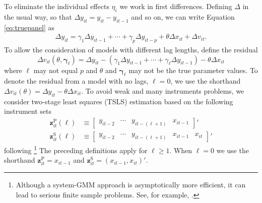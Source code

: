 To eliminate the individual effects $\eta_i$ we work in first differences.
Defining $\Delta$ in the usual way, so that $\Delta y_{it} = y_{it} - y_{it-1}$ and so on, we can write Equation \ref{eq:truepanel} as
\begin{align}
  \Delta y_{it} = \gamma_1 \Delta y_{it-1} + \cdots + \gamma_p \Delta y_{it-p} + \theta \Delta x_{it} + \Delta v_{it}.
  \label{eq:truepaneldiff}
\end{align}
To allow the consideration of models with different lag lengths, define the residual
\begin{equation}
  \Delta v_{it}\left(\theta, \boldsymbol{\gamma}_\ell \right) = \Delta y_{it} - \left(\gamma_1 \Delta y_{it-1} + \cdots + \gamma_\ell \Delta y_{it-1} \right) - \theta \Delta x_{it} 
  \label{eq:panelresidual}
\end{equation}
where $\ell$ may not equal $p$ and $\theta$ and $\boldsymbol{\gamma}_\ell$ may not be the true parameter values.
To denote the residual from a model with no lags, $\ell = 0$, we use the shorthand $\Delta v_{it}(\theta) = \Delta y_{it} - \theta \Delta x_{it}$.
To avoid weak and many instruments problems, we consider two-stage least squares (TSLS) estimation based on the following instrument sets
\begin{align}
  \mathbf{z}_{it}^{\text{P}}(\ell) &\equiv \left[
  \begin{array}{cccc}
    y_{it-2} & \cdots & y_{it-(\ell + 1)} & x_{it-1}
  \end{array}
\right]'\\
\mathbf{z}_{it}^{\text{S}}(\ell) &\equiv \left[
\begin{array}{ccccc}
  y_{it-2} & \cdots & y_{it-(\ell + 1)} & x_{it-1} & x_{it}
\end{array}
\right]'
\end{align}
following \cite{AndersonHsiao}\footnote{Although a system-GMM approach is asymptotically more efficient, it can lead to serious finite sample problems. See, for example, \cite{Roodman}.} 
The preceding definitions apply for $\ell \geq 1$. 
When $\ell = 0$ we use the shorthand $\mathbf{z}_{it}^{\text{P}} = x_{it-1}$ and $\mathbf{z}_{it}^{\text{S}} = (x_{it-1}, x_{it})'$.

